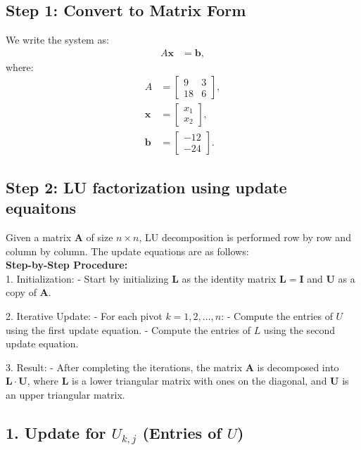 \documentclass[journal]{IEEEtran}
\numberwithin{equation}{enumi}
\numberwithin{figure}{enumi}
\begin{document}
\begin{enumerate}
	\subsection*{Step 1: Convert to Matrix Form}
	We write the system as:
	\begin{align}
		A \mathbf{x} &= \mathbf{b},
	\end{align}
	where:
	\begin{align}
		A &= \begin{bmatrix} 9 & 3 \\ 18 & 6 \end{bmatrix}, \\
		\mathbf{x} &= \begin{bmatrix} x_1 \\ x_2 \end{bmatrix}, \\
		\mathbf{b} &= \begin{bmatrix} -12 \\ -24 \end{bmatrix}.
	\end{align}
	
	\subsection*{Step 2: LU factorization using update equaitons}
    Given a matrix $ \mathbf{A} $ of size $ n \times n $, LU decomposition is performed row by row and column by column. The update equations are as follows:\\
    \textbf{Step-by-Step Procedure:}\\
1. Initialization: 
   - Start by initializing $ \mathbf{L} $ as the identity matrix $ \mathbf{L} = \mathbf{I} $ and $ \mathbf{U} $ as a copy of $ \mathbf{A} $.
   
2. Iterative Update:
   - For each pivot $ k = 1, 2, \ldots, n $:
     - Compute the entries of $ U $ using the first update equation.
     - Compute the entries of $ L $ using the second update equation.
   
3. Result:
   - After completing the iterations, the matrix $ \mathbf{A} $ is decomposed into $ \mathbf{L} \cdot \mathbf{U} $, where $ \mathbf{L} $ is a lower triangular matrix with ones on the diagonal, and $ \mathbf{U} $ is an upper triangular matrix.

    

\subsection*{1. Update for $ U_{k,j} $ (Entries of $ U $)}


\end{enumerate}
\end{document}
